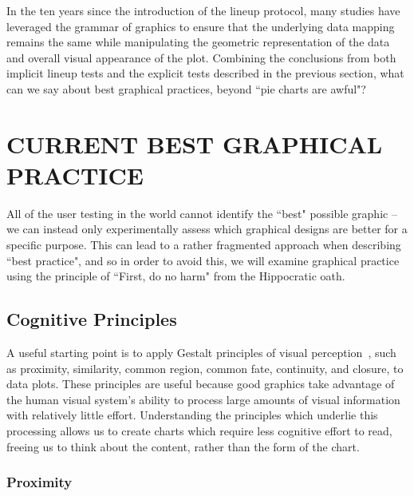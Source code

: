\documentclass[letterpaper]{ar-1col}\usepackage[]{graphicx}\usepackage[]{color}
\begin{document}
In the ten years since the introduction of the lineup protocol, many studies have leveraged the grammar of graphics to ensure that the underlying data mapping remains the same while manipulating the geometric representation of the data and overall visual appearance of the plot. Combining the conclusions from both implicit lineup tests and the explicit tests described in the previous section, what can we say about best graphical practices, beyond ``pie charts are awful"?

\section{CURRENT BEST GRAPHICAL PRACTICE} %

All of the user testing in the world cannot identify the ``best" possible graphic -- we can instead only experimentally assess which graphical designs are better for a specific purpose. This can lead to a rather fragmented approach when describing ``best practice", and so in order to avoid this, we will examine graphical practice using the principle of ``First, do no harm" from the Hippocratic oath.

\subsection{Cognitive Principles}

A useful starting point is to apply Gestalt principles of visual perception~\citep{gestalt1,gestalt2}, such as proximity, similarity, common region, common fate, continuity, and closure, to data plots. These principles are useful because good graphics take advantage of the human visual system's ability to process large amounts of visual information with relatively little effort. Understanding the principles which underlie this processing allows us to create charts which require less cognitive effort to read, freeing us to think about the content, rather than the form of the chart.

\subsubsection{Proximity}
\end{document}
